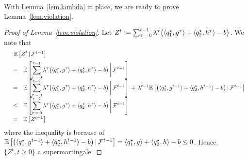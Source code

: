 \documentclass[12pt, final]{l4dc2023}
\begin{document}
With Lemma~\ref{lem.lambda} in place, we are ready to prove Lemma~\ref{lem.violation}.

\begin{proof}[Proof of Lemma~\ref{lem.violation}]
	
	Let $Z^t \mathrel{\mathop:}= \sum_{\tau\,=\,0}^{t-1}
	\lambda^{\tau} \big(\langle{ q_1^\star},{g^{\tau}}\rangle 
	+ \langle{ q_2^\star},{h^{\tau}}\rangle -b\big)$. We note that 
	\[
	\begin{array}{rcl}
	&& \!\!\!\! \!\!\!\! \!\!
	\mathbb{E} \sbr{Z^t \,\vert\,\calF^{t-1}} 
	\\[0.2cm]
	&=& \displaystyle
	\mathbb{E} \sbr{ \sum_{\tau\,=\,0}^{t-1}
		\lambda^{\tau} \big(\langle{ q_1^\star},{g^{\tau}}\rangle 
		+ \langle{ q_2^\star},{h^{\tau}}\rangle -b\big)\,\bigg\vert\,\calF^{t-1}}
	\\[0.2cm]
	&=&  \displaystyle
	\mathbb{E} \sbr{ \sum_{\tau\,=\,0}^{t-2}
		\lambda^{\tau} \big(\langle{ q_1^\star},{g^{\tau}}\rangle 
		+ \langle{ q_2^\star},{h^{\tau}}\rangle -b\big)\,\bigg\vert\,\calF^{t-1}}
	\,+\, 
	\lambda^{t-1} \mathbb{E} \sbr{\big(\langle{ q_1^\star},{g^{t-1}}\rangle 
		+ \langle{ q_2^\star},{h^{t-1}}\rangle -b\big)\,\vert\,\calF^{t-1}}
	\\[0.2cm]
	&\leq&  \displaystyle
	\mathbb{E} \sbr{ \sum_{\tau\,=\,0}^{t-2}
		\lambda^{\tau} \big(\langle{ q_1^\star},{g^{\tau}}\rangle 
		+ \langle{ q_2^\star},{h^{\tau}}\rangle -b\big)\,\bigg\vert\,\calF^{t-1}}
	\\[0.4cm]
	&=&
	\mathbb{E} \sbr{Z^{t-1}} 
	\end{array}
	\]
	where the inequality is because of $\mathbb{E} \left[\big(\langle{ q_1^\star},{g^{t-1}}\rangle 
		+ \langle{ q_2^\star},{h^{t-1}}\rangle -b\big)\,\vert\,{\mathcal{F}}^{t-1}\right] = \langle{ q_1^\star},{g}\rangle 
	+ \langle{ q_2^\star},{h}\rangle -b\leq 0$. Hence,  $\{Z^t,t\geq0 \}$ a supermartingale. 
	

\end{proof}
\end{document}
